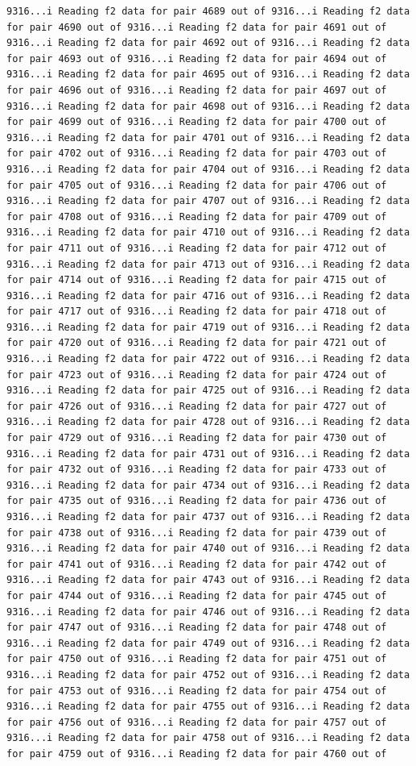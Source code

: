 \documentclass[
]{article}
\begin{document}
\begin{verbatim}
9316...i Reading f2 data for pair 4689 out of 9316...i Reading f2 data for pair 4690 out of 9316...i Reading f2 data for pair 4691 out of 9316...i Reading f2 data for pair 4692 out of 9316...i Reading f2 data for pair 4693 out of 9316...i Reading f2 data for pair 4694 out of 9316...i Reading f2 data for pair 4695 out of 9316...i Reading f2 data for pair 4696 out of 9316...i Reading f2 data for pair 4697 out of 9316...i Reading f2 data for pair 4698 out of 9316...i Reading f2 data for pair 4699 out of 9316...i Reading f2 data for pair 4700 out of 9316...i Reading f2 data for pair 4701 out of 9316...i Reading f2 data for pair 4702 out of 9316...i Reading f2 data for pair 4703 out of 9316...i Reading f2 data for pair 4704 out of 9316...i Reading f2 data for pair 4705 out of 9316...i Reading f2 data for pair 4706 out of 9316...i Reading f2 data for pair 4707 out of 9316...i Reading f2 data for pair 4708 out of 9316...i Reading f2 data for pair 4709 out of 9316...i Reading f2 data for pair 4710 out of 9316...i Reading f2 data for pair 4711 out of 9316...i Reading f2 data for pair 4712 out of 9316...i Reading f2 data for pair 4713 out of 9316...i Reading f2 data for pair 4714 out of 9316...i Reading f2 data for pair 4715 out of 9316...i Reading f2 data for pair 4716 out of 9316...i Reading f2 data for pair 4717 out of 9316...i Reading f2 data for pair 4718 out of 9316...i Reading f2 data for pair 4719 out of 9316...i Reading f2 data for pair 4720 out of 9316...i Reading f2 data for pair 4721 out of 9316...i Reading f2 data for pair 4722 out of 9316...i Reading f2 data for pair 4723 out of 9316...i Reading f2 data for pair 4724 out of 9316...i Reading f2 data for pair 4725 out of 9316...i Reading f2 data for pair 4726 out of 9316...i Reading f2 data for pair 4727 out of 9316...i Reading f2 data for pair 4728 out of 9316...i Reading f2 data for pair 4729 out of 9316...i Reading f2 data for pair 4730 out of 9316...i Reading f2 data for pair 4731 out of 9316...i Reading f2 data for pair 4732 out of 9316...i Reading f2 data for pair 4733 out of 9316...i Reading f2 data for pair 4734 out of 9316...i Reading f2 data for pair 4735 out of 9316...i Reading f2 data for pair 4736 out of 9316...i Reading f2 data for pair 4737 out of 9316...i Reading f2 data for pair 4738 out of 9316...i Reading f2 data for pair 4739 out of 9316...i Reading f2 data for pair 4740 out of 9316...i Reading f2 data for pair 4741 out of 9316...i Reading f2 data for pair 4742 out of 9316...i Reading f2 data for pair 4743 out of 9316...i Reading f2 data for pair 4744 out of 9316...i Reading f2 data for pair 4745 out of 9316...i Reading f2 data for pair 4746 out of 9316...i Reading f2 data for pair 4747 out of 9316...i Reading f2 data for pair 4748 out of 9316...i Reading f2 data for pair 4749 out of 9316...i Reading f2 data for pair 4750 out of 9316...i Reading f2 data for pair 4751 out of 9316...i Reading f2 data for pair 4752 out of 9316...i Reading f2 data for pair 4753 out of 9316...i Reading f2 data for pair 4754 out of 9316...i Reading f2 data for pair 4755 out of 9316...i Reading f2 data for pair 4756 out of 9316...i Reading f2 data for pair 4757 out of 9316...i Reading f2 data for pair 4758 out of 9316...i Reading f2 data for pair 4759 out of 9316...i Reading f2 data for pair 4760 out of 
\end{verbatim}
\end{document}
